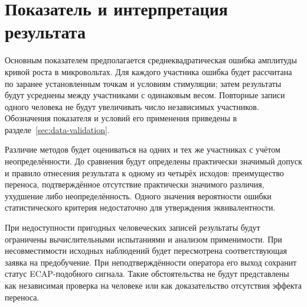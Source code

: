 \section{Показатель и интерпретация результата}
Основным показателем предполагается среднеквадратическая ошибка амплитуды кривой роста в микровольтах. Для каждого участника ошибка будет рассчитана по заранее установленным точкам и условиям стимуляции; затем результаты будут усреднены между участниками с одинаковым весом. Повторные записи одного человека не будут увеличивать число независимых участников. Обозначения показателя и условий его применения приведены в разделе~\ref{sec:data-validation}.

Различие методов будет оцениваться на одних и тех же участниках с учётом неопределённости. До сравнения будут определены практически значимый допуск и правило отнесения результата к одному из четырёх исходов: преимущество переноса, подтверждённое отсутствие практически значимого различия, ухудшение либо неопределённость. Одного значения вероятности ошибки статистического критерия недостаточно для утверждения эквивалентности.

При недоступности пригодных человеческих записей результаты будут ограничены вычислительными испытаниями и анализом применимости. При несовместимости исходных наблюдений будет пересмотрена соответствующая заявка на предобучение. При неподтверждённости оператора его выход сохранит статус ECAP-подобного сигнала. Такие обстоятельства не будут представлены как независимая проверка на человеке или как доказательство отсутствия эффекта переноса.
